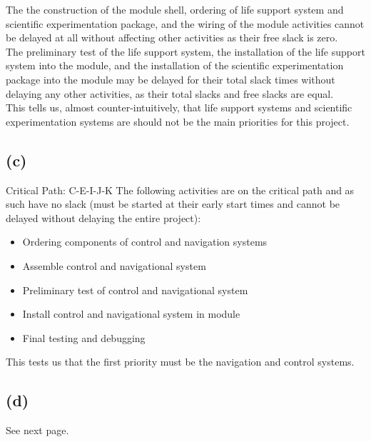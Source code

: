 \documentclass{article}
\begin{document}
	The the construction of the module shell, ordering of life support system and scientific experimentation package, and the wiring of the module activities cannot be delayed at all without affecting other activities as their free slack is zero.\\
	The preliminary test of the life support system, the installation of the life support system into the module, and the installation of the scientific experimentation package into the module may be delayed for their total slack times without delaying any other activities, as their total slacks and free slacks are equal.\\
	This tells us, almost counter-intuitively, that life support systems and scientific experimentation systems are should not be the main priorities for this project.
	
	\subsection*{(c)}
	\noindent Critical Path: C-E-I-J-K\newline
	The following activities are on the critical path and as such have no slack (must be started at their early start times and cannot be delayed without delaying the entire project):
	\begin{itemize}
		\item Ordering components of control and navigation systems\\
		\item Assemble control and navigational system\\
		\item Preliminary test of control and navigational system\\
		\item Install control and navigational system in module\\
		\item Final testing and debugging\\
	\end{itemize}
	\noindent This tests us that the first priority must be the navigation and control systems.
	
	\subsection*{(d)}
	\noindent See next page.

	\begin{sidewaystable}[!htbp]
		
	\end{sidewaystable}
\end{document}
